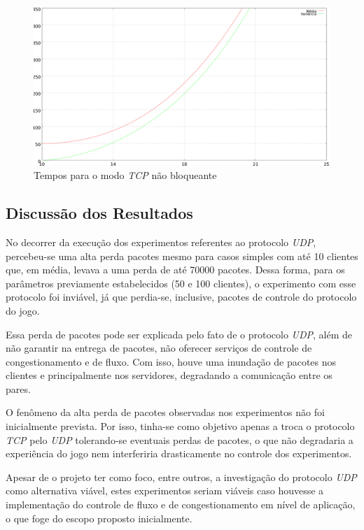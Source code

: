 \documentclass[12pt]{article}
\begin{document}
\begin{figure}[ht]
  \centering
  \includegraphics[width=1\textwidth]{img/tcp-graph.png}
  \caption{Tempos para o modo \emph{TCP} não bloqueante}
  \label{fig:tcp-graph}
\end{figure}

\subsection{Discussão dos Resultados} \label{sub:discussao}

No decorrer da execução dos experimentos referentes ao protocolo \emph{UDP},
percebeu-se uma alta perda pacotes mesmo para casos simples com até 10 clientes
que, em média, levava a uma perda de até 70000 pacotes. Dessa forma, para os
parâmetros previamente estabelecidos (50 e 100 clientes), o experimento com
esse protocolo foi inviável, já que perdia-se, inclusive, pacotes de controle
do protocolo do jogo. 

Essa perda de pacotes pode ser explicada pelo fato de o protocolo \emph{UDP},
além de não garantir na entrega de pacotes, não oferecer serviços de controle
de congestionamento e de fluxo. Com isso, houve uma inundação de pacotes nos
clientes e principalmente nos servidores, degradando a comunicação entre os
pares.

O fenômeno da alta perda de pacotes observadas nos experimentos não foi
inicialmente prevista. Por isso, tinha-se como objetivo apenas a troca o
protocolo \emph{TCP} pelo \emph{UDP} tolerando-se eventuais perdas de pacotes,
o que não degradaria a experiência do jogo nem interferiria drasticamente no
controle dos experimentos.

Apesar de o projeto ter como foco, entre outros, a investigação do protocolo
\emph{UDP} como alternativa viável, estes experimentos seriam viáveis caso
houvesse a implementação do controle de fluxo e de congestionamento em nível de
aplicação, o que foge do escopo proposto inicialmente.
\end{document}
